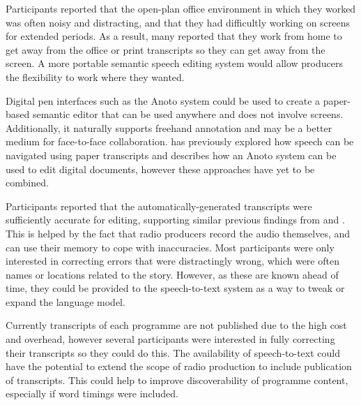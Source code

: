 Participants reported that the open-plan office environment in which they worked was often noisy and distracting, and
that they had difficultly working on screens for extended periods. As a result, many reported that they work from home
to get away from the office or print transcripts so they can get away from the screen. A more portable semantic speech
editing system would allow producers the flexibility to work where they wanted.

Digital pen interfaces such as the Anoto system could be used to create a paper-based semantic editor that can be used
anywhere and does not involve screens. Additionally, it naturally supports freehand annotation and may be a better
medium for face-to-face collaboration.  \cite{Klemmer2003} has previously explored how speech can be navigated using
paper transcripts and \cite{Weibel2008} describes how an Anoto system can be used to edit digital documents, however
these approaches have yet to be combined.

Participants reported that the automatically-generated transcripts were sufficiently accurate for editing, supporting
similar previous findings from \citet{Whittaker2004} and \citet{Sivaraman2016}. This is helped by the fact that radio
producers record the audio themselves, and can use their memory to cope with inaccuracies. Most participants were only
interested in correcting errors that were distractingly wrong, which were often names or locations related to the
story. However, as these are known ahead of time, they could be provided to the speech-to-text system as a way to tweak
or expand the language model.

Currently transcripts of each programme are not published due to the high cost and
overhead, however several participants were interested in fully correcting their transcripts so they could do this.
The availability of speech-to-text could have the potential to extend the scope of radio production to include
publication of transcripts. This could help to improve discoverability of programme content, especially if word timings
were included.



